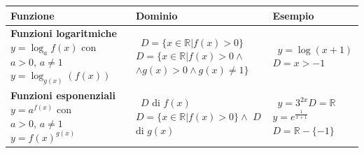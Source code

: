   \begin{tabularx}{\textwidth}{XXX}
  \toprule
  Funzione & Dominio  & Esempio \\
  \midrule
  \textbf{Funzioni logaritmiche} \newline \(y=\log_af(x)\) 
\newline con \(a>0,\,a\neq1\) \newline \newline \(y=\log_{g(x)}(f(x))\) 
  & \(\,\) \newline \(D=\{x\in\mathbb{R}\vert f(x)>0\}\)\newline 
\newline \newline\(D=\{x\in\mathbb{R}\vert f(x)>0\land\)\newline\(\land 
g(x)>0\land g(x)\neq1\}\)
  & \(\,\) \newline \(y=\log(x+1)\)\newline \(D=x>-1\)\\
  \midrule
  
   \textbf{Funzioni esponenziali} \newline \(y=a^{f(x)}\) 
\newline con \(a>0,\,a\neq1\) \newline\newline  \(y={f(x)}^{g(x)}\) 
  & \(\,\) \newline \(D\) di \(f(x)\) \newline \newline \newline 
\(D=\{x\in\mathbb{R}\vert f(x)>0\}\land\) \(D\) di \(g(x)\)
  &  \(\,\) \newline\(y=3^{2x}\)\newline \(D= \mathbb{R}\) \newline  
\newline\(y=e^{\frac{1}{x+1}}\) \newline \(D=\mathbb{R}-\{-1\}\) \\
  \midrule
  

\end{tabularx}
